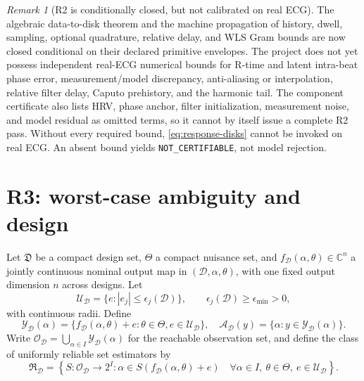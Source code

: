 \documentclass[11pt]{article}
\theoremstyle{definition}
\theoremstyle{remark}
\newtheorem{remark}[theorem]{Remark}
\newcommand{\C}{\mathbb C}
\newcommand{\Aset}{\mathcal A}
\newcommand{\Yset}{\mathcal Y}
\begin{document}
\begin{remark}[R2 is conditionally closed, but not calibrated on real ECG]
\label{rem:r2-gap}
The algebraic data-to-disk theorem and the machine propagation of history,
dwell, sampling, optional quadrature, relative delay, and WLS Gram bounds are
now closed conditional on their declared primitive envelopes.  The project
does not yet possess independent real-ECG numerical bounds for R-time and
latent intra-beat phase error, measurement/model discrepancy, anti-aliasing or
interpolation, relative filter delay, Caputo prehistory, and the harmonic tail.
The component certificate also lists HRV, phase anchor, filter initialization,
measurement noise, and model residual as omitted terms, so it cannot by itself
issue a complete R2 pass.  Without every required bound,
\eqref{eq:response-disks} cannot be invoked on real ECG.  An absent bound
yields \texttt{NOT\_CERTIFIABLE}, not model rejection.
\end{remark}

\section{R3: worst-case ambiguity and design}

Let \(\mathfrak D\) be a compact design set, \(\Theta\) a compact nuisance
set, and \(f_{\mathcal D}(\alpha,\theta)\in\C^n\) a jointly continuous nominal
output map in \((\mathcal D,\alpha,\theta)\), with one fixed output dimension
\(n\) across designs.  Let
\[
 \mathcal U_{\mathcal D}=
 \{e:|e_j|\le\epsilon_j(\mathcal D)\},\qquad
 \epsilon_j(\mathcal D)\ge\epsilon_{\min}>0,
\]
with continuous radii.  Define
\[
 \Yset_{\mathcal D}(\alpha)=
 \{f_{\mathcal D}(\alpha,\theta)+e:
   \theta\in\Theta,e\in\mathcal U_{\mathcal D}\},
\quad
 \Aset_{\mathcal D}(y)=
 \{\alpha:y\in\Yset_{\mathcal D}(\alpha)\}.
\]
Write \(\mathcal O_{\mathcal D}=\bigcup_{\alpha\in I}
\Yset_{\mathcal D}(\alpha)\) for the reachable observation set, and define
the class of uniformly reliable set estimators by
\[
 \mathfrak R_{\mathcal D}=\left\{S:\mathcal O_{\mathcal D}\to2^I:
 \alpha\in S(f_{\mathcal D}(\alpha,\theta)+e)
 \quad\forall\alpha\in I,\ \theta\in\Theta,\ e\in\mathcal U_{\mathcal D}
 \right\}.
\]
\end{document}
